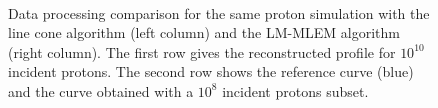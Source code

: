 \begin{figure}
  \\
  \caption{Data processing comparison for the same proton simulation with the line cone algorithm (left column) and the LM-MLEM algorithm (right column). The first row gives the reconstructed profile for $10^{10}$ incident protons. The second row shows the reference curve (blue) and the curve obtained with a $10^8$ incident protons subset.}%
\end{figure}

